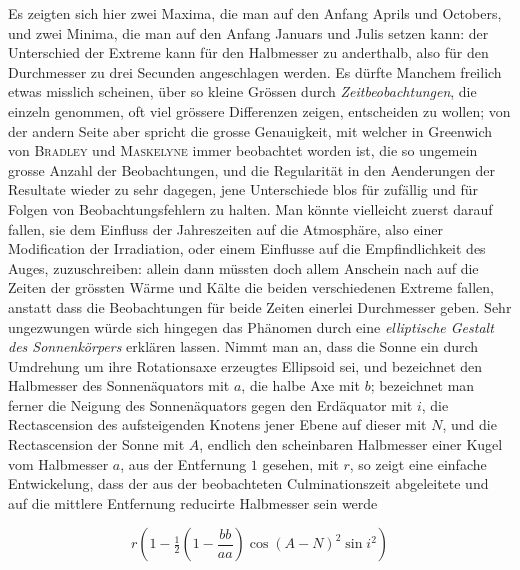 Es zeigten sich hier zwei Maxima, die man auf den Anfang Aprils und Octobers, und zwei Minima, die man auf den Anfang Januars und Julis setzen kann: der Unterschied der Extreme kann für den Halbmesser zu anderthalb, also für den Durchmesser zu drei Secunden angeschlagen werden. Es dürfte Manchem freilich etwas misslich scheinen, über so kleine Grössen durch \emph{Zeitbeobachtungen}, die einzeln genommen, oft viel grössere Differenzen zeigen, entscheiden zu wollen; von der andern Seite aber spricht die grosse Genauigkeit, mit welcher in Greenwich von \textsc{Bradley} und \textsc{Maskelyne} immer beobachtet worden ist, die so ungemein grosse Anzahl der Beobachtungen, und die Regularität in den Aenderungen der Resultate wieder zu sehr dagegen, jene Unterschiede blos für zufällig und für Folgen von Beobachtungsfehlern zu halten. Man könnte vielleicht zuerst darauf fallen, sie dem Einfluss der Jahreszeiten auf die Atmosphäre, also einer Modification der Irradiation, oder einem Einflusse auf die Empfindlichkeit des Auges, zuzuschreiben: allein dann müssten doch allem Anschein nach auf die Zeiten der grössten Wärme und Kälte die beiden verschiedenen Extreme fallen, anstatt dass die Beobachtungen für beide Zeiten einerlei Durchmesser geben. Sehr ungezwungen würde sich hingegen das Phänomen durch eine \emph{elliptische Gestalt des Sonnenkörpers} erklären lassen. Nimmt man an, dass die Sonne ein durch Umdrehung um ihre Rotationsaxe erzeugtes Ellipsoid sei, und bezeichnet den Halbmesser des Sonnenäquators mit $a$, die halbe Axe mit $b$; bezeichnet man ferner die Neigung des Sonnenäquators gegen den Erdäquator mit $i$, die Rectascension des aufsteigenden Knotens jener Ebene auf dieser mit $N$, und die Rectascension der Sonne mit $A$, endlich den scheinbaren Halbmesser einer Kugel vom Halbmesser $a$, aus der Entfernung $1$ gesehen, mit $r$, so zeigt eine einfache Entwickelung, dass der aus der beobachteten Culminationszeit abgeleitete und auf die mittlere Entfernung reducirte Halbmesser sein werde

\[ r\left(1-\tfrac{1}{2}\left(1-\frac{bb}{aa}\right)\cos(A-N)^2\sin i^2\right) \]


